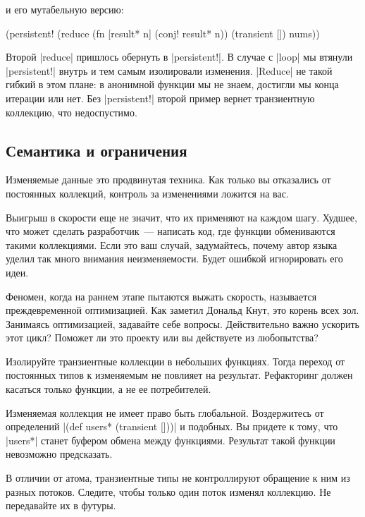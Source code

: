 \noindent
и его мутабельную версию:

\begin{english}
  \begin{clojure}
(persistent!
 (reduce
  (fn [result* n]
    (conj! result* n))
  (transient [])
  nums))
  \end{clojure}
\end{english}

Второй \spverb|reduce| пришлось обернуть в \spverb|persistent!|. В случае с
\spverb|loop| мы втянули \spverb|persistent!| внутрь и тем самым изолировали
изменения. \spverb|Reduce| не такой гибкий в этом плане: в анонимной функции мы
не знаем, достигли мы конца итерации или нет. Без \spverb|persistent!| второй
пример вернет транзиентную коллекцию, что недоспустимо.

\subsection{Семантика и ограничения}

Изменяемые данные это продвинутая техника. Как только вы отказались от
постоянных коллекций, контроль за изменениями ложится на вас.

Выигрыш в скорости еще не значит, что их применяют на каждом шагу. Худшее, что
может сделать разработчик~--- написать код, где функции обмениваются такими
коллекциями. Если это ваш случай, задумайтесь, почему автор языка уделил так
много внимания неизменяемости. Будет ошибкой игнорировать его идеи.

Феномен, когда на раннем этапе пытаются выжать скорость, называется
преждевременной оптимизацией. Как заметил Дональд Кнут, это корень всех зол.
Занимаясь оптимизацией, задавайте себе вопросы. Действительно важно ускорить
этот цикл? Поможет ли это проекту или вы действуете из любопытства?

Изолируйте транзиентные коллекции в небольших функциях. Тогда переход от
постоянных типов к изменяемым не повлияет на результат. Рефакторинг должен
касаться только функции, а не ее потребителей.

Изменяемая коллекция не имеет право быть глобальной. Воздержитесь от определений
\spverb|(def users* (transient []))| и подобных. Вы придете к тому, что
\spverb|users*| станет буфером обмена между функциями. Результат такой функции
невозможно предсказать.

В отличии от атома, транзиентные типы не контроллируют обращение к ним из разных
потоков. Следите, чтобы только один поток изменял коллекцию. Не передавайте их в
футуры.

